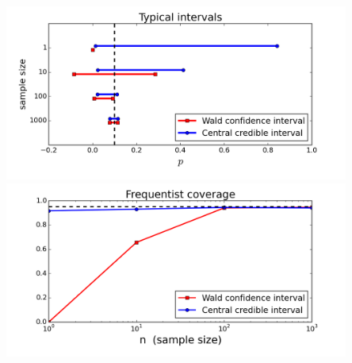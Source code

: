 \documentclass[12pt]{article}
\begin{document}
\begin{center}
\includegraphics[trim=0 0 0 0, clip, width=0.85\textwidth]{code/ex3-intervals.png}
\includegraphics[trim=0 0 0 0, clip, width=0.85\textwidth]{code/ex3-coverage.png}
\end{center}
\end{document}
